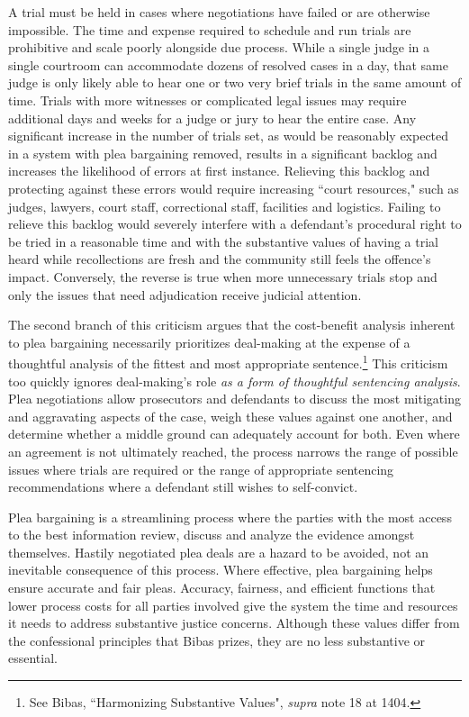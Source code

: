 A trial must be held in cases where negotiations have failed or are otherwise impossible. The time and expense required to schedule and run trials are prohibitive and scale poorly alongside due process. While a single judge in a single courtroom can accommodate dozens of resolved cases in a day, that same judge is only likely able to hear one or two very brief trials in the same amount of time. Trials with more witnesses or complicated legal issues may require additional days and weeks for a judge or jury to hear the entire case. Any significant increase in the number of trials set, as would be reasonably expected in a system with plea bargaining removed, results in a significant backlog and increases the likelihood of errors at first instance. Relieving this backlog and protecting against these errors would require increasing ``court resources," such as judges, lawyers, court staff, correctional staff, facilities and logistics. Failing to relieve this backlog would severely interfere with a defendant's procedural right to be tried in a reasonable time and with the substantive values of having a trial heard while recollections are fresh and the community still feels the offence's impact. Conversely, the reverse is true when more unnecessary trials stop and only the issues that need adjudication receive judicial attention.

The second branch of this criticism argues that the cost-benefit analysis inherent to plea bargaining necessarily prioritizes deal-making at the expense of a thoughtful analysis of the fittest and most appropriate sentence.\footnote{See Bibas, ``Harmonizing Substantive Values", \textit{supra} note 18 at 1404.} This criticism too quickly ignores deal-making's role \textit{as a form of thoughtful sentencing analysis}. Plea negotiations allow prosecutors and defendants to discuss the most mitigating and aggravating aspects of the case, weigh these values against one another, and determine whether a middle ground can adequately account for both. Even where an agreement is not ultimately reached, the process narrows the range of possible issues where trials are required or the range of appropriate sentencing recommendations where a defendant still wishes to self-convict.

Plea bargaining is a streamlining process where the parties with the most access to the best information review, discuss and analyze the evidence amongst themselves. Hastily negotiated plea deals are a hazard to be avoided, not an inevitable consequence of this process. Where effective, plea bargaining helps ensure accurate and fair pleas. Accuracy, fairness, and efficient functions that lower process costs for all parties involved give the system the time and resources it needs to address substantive justice concerns. Although these values differ from the confessional principles that Bibas prizes, they are no less substantive or essential.

